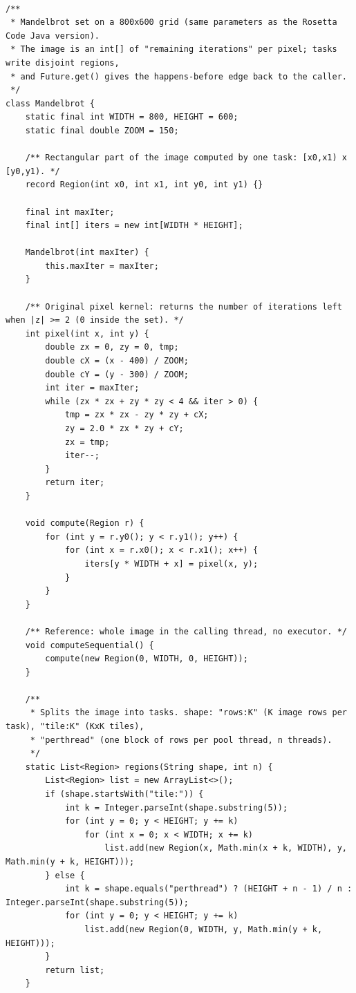 \documentclass[11pt,a4paper]{article}
\begin{document}
\begin{lstlisting}[caption={Klasa \textbf{Mandelbrot}: jądro obliczeń, fragmenty obrazu i podział na zadania (\texttt{src/Mandelbrot.java})}]

/**
 * Mandelbrot set on a 800x600 grid (same parameters as the Rosetta Code Java version).
 * The image is an int[] of "remaining iterations" per pixel; tasks write disjoint regions,
 * and Future.get() gives the happens-before edge back to the caller.
 */
class Mandelbrot {
    static final int WIDTH = 800, HEIGHT = 600;
    static final double ZOOM = 150;

    /** Rectangular part of the image computed by one task: [x0,x1) x [y0,y1). */
    record Region(int x0, int x1, int y0, int y1) {}

    final int maxIter;
    final int[] iters = new int[WIDTH * HEIGHT];

    Mandelbrot(int maxIter) {
        this.maxIter = maxIter;
    }

    /** Original pixel kernel: returns the number of iterations left when |z| >= 2 (0 inside the set). */
    int pixel(int x, int y) {
        double zx = 0, zy = 0, tmp;
        double cX = (x - 400) / ZOOM;
        double cY = (y - 300) / ZOOM;
        int iter = maxIter;
        while (zx * zx + zy * zy < 4 && iter > 0) {
            tmp = zx * zx - zy * zy + cX;
            zy = 2.0 * zx * zy + cY;
            zx = tmp;
            iter--;
        }
        return iter;
    }

    void compute(Region r) {
        for (int y = r.y0(); y < r.y1(); y++) {
            for (int x = r.x0(); x < r.x1(); x++) {
                iters[y * WIDTH + x] = pixel(x, y);
            }
        }
    }

    /** Reference: whole image in the calling thread, no executor. */
    void computeSequential() {
        compute(new Region(0, WIDTH, 0, HEIGHT));
    }

    /**
     * Splits the image into tasks. shape: "rows:K" (K image rows per task), "tile:K" (KxK tiles),
     * "perthread" (one block of rows per pool thread, n threads).
     */
    static List<Region> regions(String shape, int n) {
        List<Region> list = new ArrayList<>();
        if (shape.startsWith("tile:")) {
            int k = Integer.parseInt(shape.substring(5));
            for (int y = 0; y < HEIGHT; y += k)
                for (int x = 0; x < WIDTH; x += k)
                    list.add(new Region(x, Math.min(x + k, WIDTH), y, Math.min(y + k, HEIGHT)));
        } else {
            int k = shape.equals("perthread") ? (HEIGHT + n - 1) / n : Integer.parseInt(shape.substring(5));
            for (int y = 0; y < HEIGHT; y += k)
                list.add(new Region(0, WIDTH, y, Math.min(y + k, HEIGHT)));
        }
        return list;
    }
\end{lstlisting}
\end{document}
